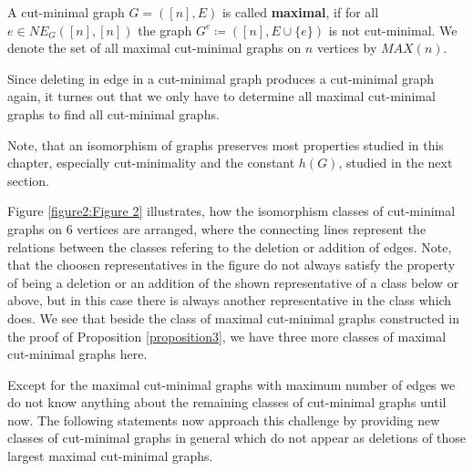 \begin{defi}
A cut-minimal graph \(G=([n],E)\) is called \textbf{maximal}, if for all\\
\(e\in NE_G([n],[n])\) the graph \(G^e\coloneqq ([n],E\cup\{e\})\) is not cut-minimal. We denote the set of all maximal cut-minimal graphs on \(n\) vertices by \(MAX(n)\).
\end{defi}
Since deleting in edge in a cut-minimal graph produces a cut-minimal graph again, it turnes out that we only have to determine all maximal cut-minimal graphs to find all cut-minimal graphs.

\begin{rem}
Note, that an isomorphism of graphs preserves most properties studied in this chapter, especially cut-minimality and the constant \(h(G)\), studied in the next section.
\end{rem}

Figure \ref{figure2:Figure 2} illustrates, how the isomorphism classes of cut-minimal graphs on \(6\) vertices are arranged, where the connecting lines represent the relations between the classes refering to the deletion or addition of edges. Note, that the choosen representatives in the figure do not always satisfy the property of being a deletion or an addition of the shown representative of a class below or above, but in this case there is always another representative in the class which does. We see that beside the class of maximal cut-minimal graphs constructed in the proof of Proposition \ref{proposition3}, we have three more classes of maximal cut-minimal graphs here.

\newpage



Except for the maximal cut-minimal graphs with maximum number of edges we do not know anything about the remaining classes of cut-minimal graphs until now. The following statements now approach this challenge by providing new classes of cut-minimal graphs in general which do not appear as deletions of those largest maximal cut-minimal graphs.

